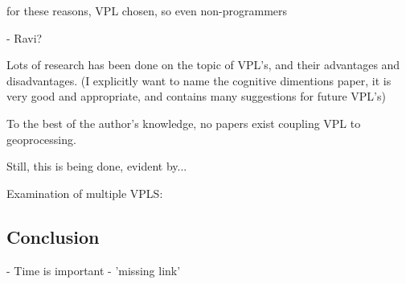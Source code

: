 for these reasons, VPL chosen, so even non-programmers



- Ravi?

Lots of research has been done on the topic of VPL's, and their advantages and disadvantages. 
(I explicitly want to name the cognitive dimentions paper, it is very good and appropriate, and contains many suggestions for future VPL's)








To the best of the author's knowledge, no papers exist coupling VPL to geoprocessing.

Still, this is being done, evident by...


Examination of multiple VPLS:






\subsection{Conclusion}

- Time is important 
- 'missing link'


